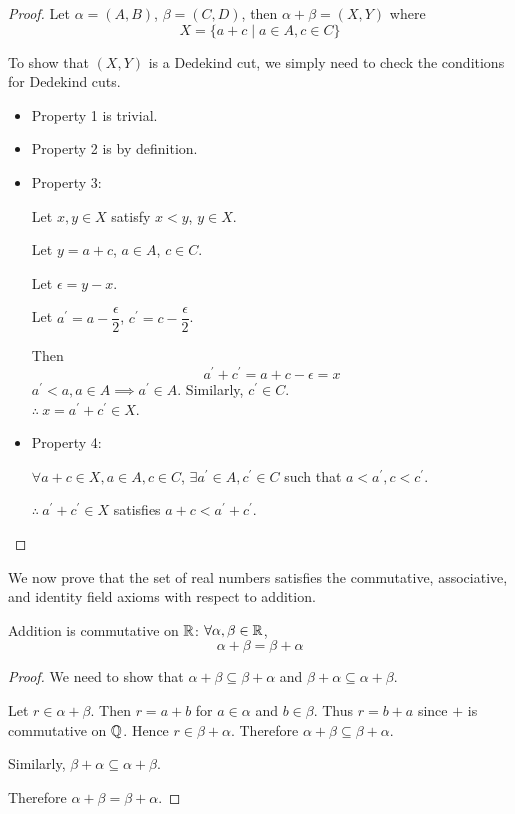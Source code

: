 \begin{proof}
Let $\alpha = (A,B)$, $\beta = (C,D)$, then $\alpha + \beta = (X,Y)$ where
\[ X = \{a+c \mid a \in A, c \in C\} \]

To show that $(X,Y)$ is a Dedekind cut, we simply need to check the conditions for Dedekind cuts. 
\begin{itemize}
\item Property 1 is trivial.

\item Property 2 is by definition.

\item Property 3:

Let $x,y \in X$ satisfy $x<y$, $y \in X$. 

Let $y = a + c$, $a \in A$, $c \in C$.

Let $\epsilon = y - x$.

Let $a^\prime = a - \dfrac{\epsilon}{2}$, $c^\prime = c - \dfrac{\epsilon}{2}$.

Then \[ a^\prime + c^\prime = a + c - \epsilon = x \]
$a^\prime < a, a \in A \implies a^\prime \in A$. Similarly, $c^\prime \in C$.\\
$\therefore\:x = a^\prime +c^\prime \in X$.

\item Property 4:

$\forall a+c \in X, a \in A, c \in C$, $\exists a^\prime \in A, c^\prime \in C$ such that $a<a^\prime, c<c^\prime$.

$\therefore\:a^\prime +c^\prime \in X$ satisfies $a+c < a^\prime+c^\prime$.
\end{itemize}
\end{proof}

We now prove that the set of real numbers satisfies the commutative, associative, and identity field axioms with respect to addition.

\begin{proposition}
Addition is commutative on $\mathbb R$: $\forall\alpha,\beta\in\mathbb R$,
\[ \alpha+\beta=\beta+\alpha \]
\end{proposition}

\begin{proof}
We need to show that $\alpha+\beta\subseteq\beta+\alpha$ and $\beta+\alpha\subseteq\alpha+\beta$.

Let $r\in\alpha+\beta$. Then $r=a+b$ for $a\in\alpha$ and $b\in\beta$. Thus $r=b+a$ since $+$ is commutative on $\mathbb Q$. Hence $r\in\beta+\alpha$. Therefore $\alpha+\beta\subseteq\beta+\alpha$.

Similarly, $\beta+\alpha\subseteq\alpha+\beta$.

Therefore $\alpha+\beta=\beta+\alpha$.
\end{proof}

